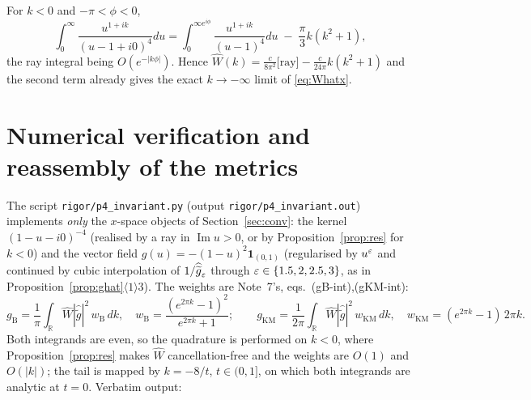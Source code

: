 \documentclass[11pt]{article}
\newcommand{\Wh}{\widehat W}
\newcommand{\gh}{\widehat{\widetilde g}}
\newcommand{\gB}{g_{\mathrm B}}
\newcommand{\gKM}{g_{\mathrm{KM}}}
\begin{document}
\begin{proposition}\label{prop:res}
For $k<0$ and $-\pi<\phi<0$,
\begin{equation}\label{eq:resshift}
 \int_0^\infty\!\frac{u^{1+ik}}{(u-1+i0)^4}du
 =\int_{0}^{\infty e^{i\phi}}\!\frac{u^{1+ik}}{(u-1)^4}du\;-\;\frac{\pi}{3}k(k^2+1),
\end{equation}
the ray integral being $O(e^{-|k\phi|})$.  Hence
$\Wh(k)=\frac{c}{8\pi^2}\bigl[\text{ray}\bigr]-\frac{c}{24\pi}k(k^2+1)$ and the second term already
gives the exact $k\to-\infty$ limit of \eqref{eq:Whatx}.
\end{proposition}
\lstep{1}{1}{$u\mapsto u^{1+ik}(u-1)^{-4}$ is holomorphic on $\mathbb C\setminus((-\infty,0]\cup\{1\})$,
with a pole of order $4$ at $u=1$.}

\section{Numerical verification and reassembly of the metrics}\label{sec:num}

The script \texttt{rigor/p4\_invariant.py} (output \texttt{rigor/p4\_invariant.out}) implements
\emph{only} the $x$-space objects of Section~\ref{sec:conv}: the kernel $(1-u-i0)^{-4}$ (realised by a
ray in $\operatorname{Im}u>0$, or by Proposition~\ref{prop:res} for $k<0$) and the vector field
$g(u)=-(1-u)^2\mathbf 1_{(0,1)}$ (regularised by $u^{\varepsilon}$ and continued by cubic interpolation of
$1/\gh_\eps$ through $\varepsilon\in\{1.5,2,2.5,3\}$, as in Proposition~\ref{prop:ghat}$\langle1\rangle3$).
The weights are Note~7's, eqs.\ (gB-int),(gKM-int):
\begin{equation}\label{eq:weights}
 \gB=\frac1\pi\int_{\mathbb R}\Wh|\gh|^2\,w_{\mathrm B}\,dk,\quad
 w_{\mathrm B}=\frac{(e^{2\pi k}-1)^2}{e^{2\pi k}+1};\qquad
 \gKM=\frac1{2\pi}\int_{\mathbb R}\Wh|\gh|^2\,w_{\mathrm{KM}}\,dk,\quad
 w_{\mathrm{KM}}=(e^{2\pi k}-1)\,2\pi k .
\end{equation}
Both integrands are even, so the quadrature is performed on $k<0$, where Proposition~\ref{prop:res}
makes $\Wh$ cancellation-free and the weights are $O(1)$ and $O(|k|)$; the tail is mapped by $k=-8/t$,
$t\in(0,1]$, on which both integrands are analytic at $t=0$.  Verbatim output:
\end{document}
